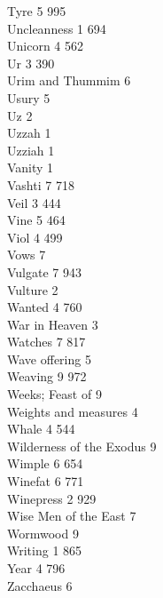 Tyre \hfill 5 \quad \phantom{0}995\\
Uncleanness \hfill 1 \quad \phantom{0}694\\
Unicorn \hfill 4 \quad \phantom{0}562\\
Ur \hfill 3 \quad \phantom{0}390\\
Urim and Thummim \hfill 6 \\
Usury \hfill 5 \\
Uz \hfill 2 \\
Uzzah \hfill 1 \\
Uzziah \hfill 1 \\
Vanity \hfill 1 \\
Vashti \hfill 7 \quad \phantom{0}718\\
Veil \hfill 3 \quad \phantom{0}444\\
Vine \hfill 5 \quad \phantom{0}464\\
Viol \hfill 4 \quad \phantom{0}499\\
Vows \hfill 7 \\
Vulgate \hfill 7 \quad \phantom{0}943\\
Vulture \hfill 2 \\
Wanted \hfill 4 \quad \phantom{0}760\\
War in Heaven \hfill 3 \\
Watches \hfill 7 \quad \phantom{0}817\\
Wave offering \hfill 5 \\
Weaving \hfill 9 \quad \phantom{0}972\\
Weeks; Feast of \hfill 9 \\
Weights and measures \hfill 4 \\
Whale \hfill 4 \quad \phantom{0}544\\
Wilderness of the Exodus \hfill 9 \\
Wimple \hfill 6 \quad \phantom{0}654\\
Winefat \hfill 6 \quad \phantom{0}771\\
Winepress \hfill 2 \quad \phantom{0}929\\
Wise Men of the East \hfill 7 \\
Wormwood \hfill 9 \\
Writing \hfill 1 \quad \phantom{0}865\\
Year \hfill 4 \quad \phantom{0}796\\
Zacchaeus \hfill 6 \\

